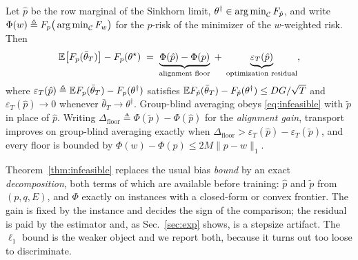 \begin{theorem}
\label{thm:infeasible}
Let $\hat p$ be the row marginal of the Sinkhorn limit,
$\theta^\dagger\in\operatorname*{arg\,min}_{\mathcal{C}}F_{\hat p}$, and write
$\Phi(w)\triangleq F_p\big(\operatorname*{arg\,min}_{\mathcal{C}} F_w\big)$ for the $p$-risk of
the minimizer of the $w$-weighted risk. Then
\begin{equation}
\mathbb{E}\big[F_p(\bar\theta_T)\big]-F_p(\theta^\star)
\;=\;\underbrace{\Phi(\hat p)-\Phi(p)}_{\text{alignment floor}}
\;+\;\underbrace{\varepsilon_T(\hat p)}_{\text{optimization residual}} ,
\label{eq:infeasible}
\end{equation}
where $\varepsilon_T(\hat p)\triangleq\mathbb{E} F_p(\bar\theta_T)-F_p(\theta^\dagger)$
satisfies $\mathbb{E} F_{\hat p}(\bar\theta_T)-F_{\hat p}(\theta^\dagger)\le DG/\sqrt{T}$
and $\varepsilon_T(\hat p)\to 0$ whenever $\bar\theta_T\to\theta^\dagger$.
Group-blind averaging obeys \eqref{eq:infeasible} with $\tilde p$ in place of
$\hat p$. Writing $\Delta_{\mathrm{floor}}\triangleq\Phi(\tilde p)-\Phi(\hat p)$
for the \emph{alignment gain}, transport improves on group-blind averaging
exactly when $\Delta_{\mathrm{floor}}>\varepsilon_T(\hat p)-\varepsilon_T(\tilde p)$,
and every floor is bounded by $\Phi(w)-\Phi(p)\le 2M\|p-w\|_1$.
\end{theorem}
Theorem~\ref{thm:infeasible} replaces the usual bias \emph{bound}
\cite{rahimi2025fedavot} by an exact \emph{decomposition}, both terms of which
are available before training: $\hat p$ and $\tilde p$ from $(p,q,E)$, and
$\Phi$ exactly on instances with a closed-form or convex frontier. The gain is
fixed by the instance and decides the sign of the comparison; the residual is
paid by the estimator and, as Sec.~\ref{sec:exp} shows, is a stepsize
artifact. The $\ell_1$ bound is the weaker object and we report both, because
it turns out too loose to discriminate.
